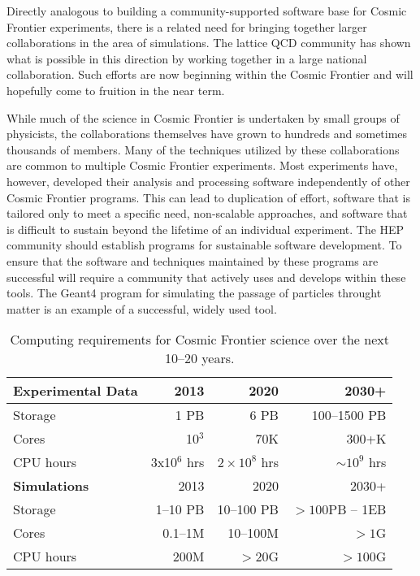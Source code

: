 Directly analogous to building a community-supported
software base for Cosmic Frontier experiments, there is a related need
for bringing together larger collaborations in the area of
simulations. The lattice QCD community has shown what is possible in this
direction by working together in a large national collaboration. Such
efforts are now beginning within the Cosmic Frontier and will
hopefully come to fruition in the near term.


While much of the science in Cosmic Frontier is undertaken by small
groups of physicists, the collaborations themselves have grown to
hundreds and sometimes thousands of members. Many of the techniques
utilized by these collaborations are common to multiple Cosmic Frontier 
experiments. Most experiments have, however, developed their
analysis and processing software independently of other Cosmic Frontier 
programs. This can lead to duplication of effort, software
that is tailored only to meet a specific need, non-scalable
approaches, and software that is difficult to sustain beyond the
lifetime of an individual experiment. 
The HEP community should establish programs for sustainable software
development.
To ensure that the software and
techniques maintained by these programs are successful will require a
community that actively uses and develops within these tools.
The Geant4 program for simulating the passage of
particles throught matter is an example of a successful, widely used tool.


\begin{center}
\begin{table}
\caption{Computing requirements for Cosmic Frontier science over the next
 10--20 years.}
\begin{centering}
\begin{tabular}{|l|r|r|r|} 
 \hline 
{\bf Experimental Data} & 2013 & 2020 & 2030+ \\
\hline
Storage & 1 PB & 6 PB & 100--1500 PB \\
Cores & 10$^3$ & 70K & 300+K \\
CPU hours & 3x10$^6$ hrs & $2\times 10^8$ hrs & $\sim 10^9$ hrs \\
 \hline 
{\bf Simulations} &2013 & 2020 & 2030+ \\
 \hline 
Storage & 1--10 PB & 10--100 PB & $> 100 $PB -- 1EB\\
Cores & 0.1--1M & 10--100M &$> 1$G\\
CPU hours & 200M & $>$20G & $> 100$G\\
\hline
\end{tabular}
\end{centering}
\label{tab:CosmicCompNeeds}
\end{table}
\end{center}


